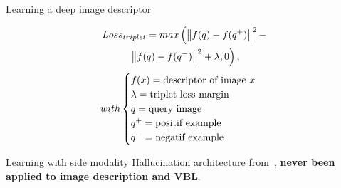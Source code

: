 \begin{frame}{Learning a deep image descriptor}
\begin{minipage}{0.49\linewidth}
\begin{minipage}{0.7\linewidth}
\begin{figure}
			\end{figure}
			\vfill
		\end{minipage}
	\end{minipage}
	\begin{minipage}{0.48\linewidth}
		\begin{multline}
			\label{eq:triplet_loss}
			Loss_{triplet} = max\left( \left\lVert f(q) - f(q^+)\right\rVert^2 - \right. \\
			\left. \left\lVert f(q) - f(q^-)\right\rVert^2 + \lambda, 0\right),
		\end{multline}
		\vfill
		\begin{align*}
		with 
		\begin{cases}
				f(x) = \textnormal{descriptor of image $x$ } \\
				\lambda = \textnormal{triplet loss margin} \\
				q = \textnormal{query image} \\
				q^+ = \textnormal{positif example} \\
				q^- = \textnormal{negatif example} \\
		\end{cases}
		\end{align*}
	\end{minipage}
	
\end{frame}


\begin{frame}{Learning with side modality}
	\vfill
	Hallucination architecture from~\cite{Hoffman2016}, \textbf{never been applied to image description and VBL}.
	\vfill
	\begin{figure}
		\centering
	\end{figure}
	\vfill
\end{frame}
